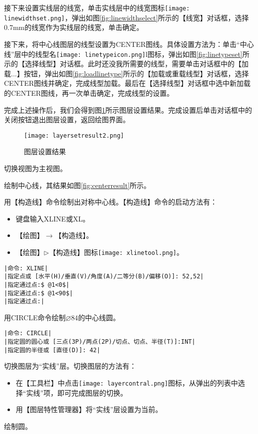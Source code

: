 \begin{procedure}
接下来设置实线层的线宽，单击实线层中的线宽图标\texttt{[image: linewidthset.png]}，弹出如图\ref{fig:linewidthselect}所示的【线宽】对话框，选择0.7mm的线宽作为实线层的线宽，单击确定。

接下来，将中心线图层的线型设置为CENTER图线。具体设置方法为：单击“中心线”层中的线型名\texttt{[image: linetypeicon.png]}l图标，弹出如图\ref{fig:linetypeset}所示的【选择线型】对话框。此时还没我所需要的线型，需要单击对话框中的【加载...】按钮，弹出如图\ref{fig:loadlinetype}所示的【加载或重载线型】对话框，选择CENTER图线并确定，完成线型加载。最后在【选择线型】对话框中选中新加载的CENTER图线，再一次单击确定，完成线型的设置。
\begin{figure}[htbp]
\centering
\begin{floatrow}
\end{floatrow}
\end{figure}

完成上述操作后，我们会得到图\ref{fig:layersetresult2}所示图层设置结果。完成设置后单击对话框中的关闭按钮退出图层设置，返回绘图界面。
\begin{figure}[htbp]
\centering
\texttt{[image: layersetresult2.png]}
\caption{图层设置结果}\label{fig:layersetresult2}
\end{figure}

\item 切换视图为主视图。
\item 绘制中心线，其结果如图\ref{fig:centerresult}所示。

用【构造线】命令绘制出对称中心线。【构造线】命令的启动方法有：
\begin{itemize}
\item 键盘输入XLINE或XL。
\item 【绘图】$\rightarrow$【构造线】。
\item 【绘图】$\triangleright$【构造线】图标\texttt{[image: xlinetool.png]}。
\end{itemize}
\begin{lstlisting}
|命令: XLINE|
|指定点或 [水平(H)/垂直(V)/角度(A)/二等分(B)/偏移(O)]: 52,52|
|指定通过点:$ @1<0$|
|指定通过点:$ @1<90$|
|指定通过点:|
\end{lstlisting}

用CIRCLE命令绘制$\diameter 84$的中心线圆。
\begin{lstlisting}
|命令: CIRCLE|
|指定圆的圆心或 [三点(3P)/两点(2P)/切点、切点、半径(T)]:INT|
|指定圆的半径或 [直径(D)]: 42|
\end{lstlisting}
\item 切换图层为“实线”层。切换图层的方法有：
\begin{itemize}
\item 在【工具栏】中点击\texttt{[image: layercontral.png]}图标，从弹出的列表中选择“实线”项，即可完成图层的切换。
\item 用【图层特性管理器】将“实线”层设置为当前。
\end{itemize}
\item 绘制圆。


\end{procedure}
